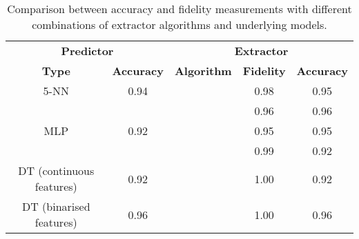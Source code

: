 
\begin{table}
	\caption{Comparison between accuracy and fidelity measurements with different combinations of extractor algorithms and underlying models.}
	\label{tab:comparison}
	\begin{tabular}{cc|ccc}
		\hline\hline
		\multicolumn{2}{c|}{\textbf{Predictor}} & 		\multicolumn{3}{c}{\textbf{Extractor}}\\
 		\textbf{Type} & \textbf{Accuracy} & \textbf{Algorithm} & \textbf{Fidelity} & \textbf{Accuracy} \\
		\hline\hline
		5-NN & 0.94 & \real{} & 0.98 & 0.95 \\
		& & \trepan{} & 0.96 & 0.96 \\
		\hline
		MLP & 0.92 & \real{} & 0.95 & 0.95 \\
		& & \trepan{} & 0.99 & 0.92 \\
		\hline
		DT (continuous features) & 0.92 & \cart{} & 1.00 & 0.92 \\
		\hline
		DT (binarised features) & 0.96 & \cart{} & 1.00 & 0.96 \\
		\hline\hline
	\end{tabular}
\end{table}
